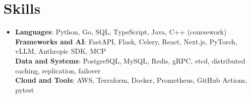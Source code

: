 \documentclass[letterpaper,11pt]{article}
\begin{document}
\section{Skills}
\begin{itemize}[leftmargin=0.15in, label={}]
  \small\item{
    \textbf{Languages}{:  Python, Go, SQL, TypeScript, Java, C++ (coursework)} \\
    \textbf{Frameworks and AI}{:  FastAPI, Flask, Celery, React, Next.js, PyTorch, vLLM, Anthropic SDK, MCP} \\
    \textbf{Data and Systems}{:  PostgreSQL, MySQL, Redis, gRPC, etcd, distributed caching, replication, failover} \\
    \textbf{Cloud and Tools}{:  AWS, Terraform, Docker, Prometheus, GitHub Actions, pytest}
  }
\end{itemize}
\end{document}

